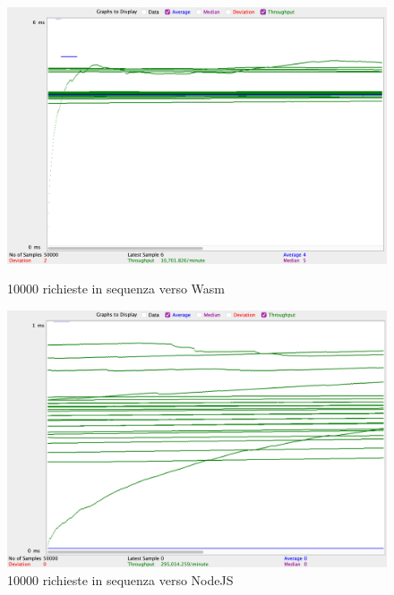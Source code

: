 \begin{figure}[!htb]
        \includegraphics[width=\linewidth]{chapters/3.poc/benchmarks_images/wasi_10000_single_req.png}
        \caption{10000 richieste in sequenza verso Wasm}\label{fig:10000_req_wasi} \endminipage\hfill
        \includegraphics[width=\linewidth]{chapters/3.poc/benchmarks_images/node_10000_single_req.png}
        \caption{10000 richieste in sequenza verso NodeJS}\label{fig:10000_req_node} \endminipage\hfill
\end{figure}


